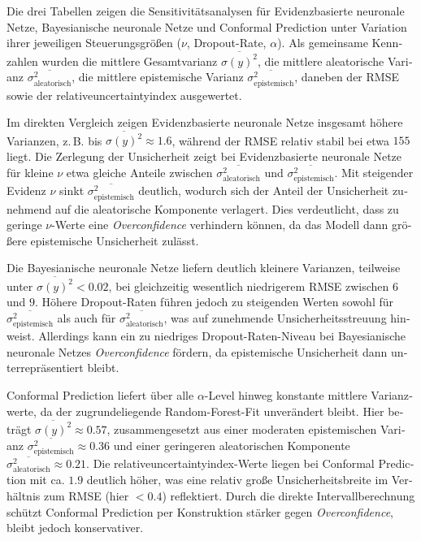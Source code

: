 \begin{otherlanguage}{ngerman}
Die drei Tabellen zeigen die Sensitivitätsanalysen für \gls{Evidenzbasierte neuronale Netze}, \gls{Bayesianische neuronale Netze} und \gls{Conformal Prediction} unter Variation ihrer jeweiligen Steuerungsgrößen (\(\nu\), Dropout-Rate, \(\alpha\)). Als gemeinsame Kennzahlen wurden die mittlere Gesamtvarianz \(\overline{\sigma(y)^2}\), die mittlere aleatorische Varianz \(\overline{\sigma_{\text{aleatorisch}}^2}\), die mittlere epistemische Varianz \(\overline{\sigma_{\text{epistemisch}}^2}\), daneben der RMSE sowie der \gls{relativeuncertaintyindex} ausgewertet.  

Im direkten Vergleich zeigen \gls{Evidenzbasierte neuronale Netze} insgesamt höhere Varianzen, z.\,B. bis \(\overline{\sigma(y)^2} \approx 1.6\), während der RMSE relativ stabil bei etwa \(155\) liegt. Die Zerlegung der Unsicherheit zeigt bei \gls{Evidenzbasierte neuronale Netze} für kleine \(\nu\) etwa gleiche Anteile zwischen \(\overline{\sigma_{\text{aleatorisch}}^2}\) und \(\overline{\sigma_{\text{epistemisch}}^2}\). Mit steigender Evidenz \(\nu\) sinkt \(\overline{\sigma_{\text{epistemisch}}^2}\) deutlich, wodurch sich der Anteil der Unsicherheit zunehmend auf die aleatorische Komponente verlagert. Dies verdeutlicht, dass zu geringe \(\nu\)-Werte eine \textit{Overconfidence} verhindern können, da das Modell dann größere epistemische Unsicherheit zulässt.  

Die \gls{Bayesianische neuronale Netze} liefern deutlich kleinere Varianzen, teilweise unter \(\overline{\sigma(y)^2} < 0.02\), bei gleichzeitig wesentlich niedrigerem RMSE zwischen \(6\) und \(9\). Höhere Dropout-Raten führen jedoch zu steigenden Werten sowohl für \(\overline{\sigma_{\text{epistemisch}}^2}\) als auch für \(\overline{\sigma_{\text{aleatorisch}}^2}\), was auf zunehmende Unsicherheitsstreuung hinweist. Allerdings kann ein zu niedriges Dropout-Raten-Niveau bei \gls{Bayesianische neuronale Netze}s \textit{Overconfidence} fördern, da epistemische Unsicherheit dann unterrepräsentiert bleibt.  

\gls{Conformal Prediction} liefert über alle \(\alpha\)-Level hinweg konstante mittlere Varianzwerte, da der zugrundeliegende Random-Forest-Fit unverändert bleibt. Hier beträgt \(\overline{\sigma(y)^2} \approx 0.57\), zusammengesetzt aus einer moderaten epistemischen Varianz \(\overline{\sigma_{\text{epistemisch}}^2} \approx 0.36\) und einer geringeren aleatorischen Komponente \(\overline{\sigma_{\text{aleatorisch}}^2} \approx 0.21\). Die \gls{relativeuncertaintyindex}-Werte liegen bei \gls{Conformal Prediction} mit ca. \(1.9\) deutlich höher, was eine relativ große Unsicherheitsbreite im Verhältnis zum RMSE (hier \(< 0.4\)) reflektiert. Durch die direkte Intervallberechnung schützt \gls{Conformal Prediction} per Konstruktion stärker gegen \textit{Overconfidence}, bleibt jedoch konservativer.  


\end{otherlanguage}
